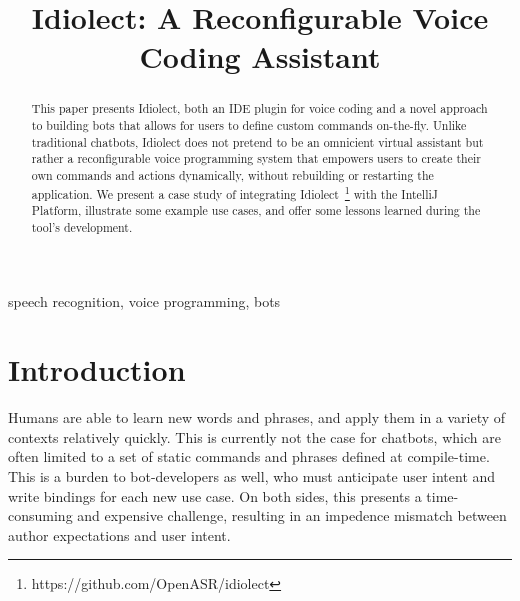 \documentclass[conference]{IEEEtran}
\begin{document}
\title{Idiolect: A Reconfigurable Voice Coding Assistant}

\author{
\and
{}
\and
{}
\and
{}
}

\maketitle

\begin{abstract}
This paper presents Idiolect, both an IDE plugin for voice coding and a novel approach to building bots that allows for users to define custom commands on-the-fly. Unlike traditional chatbots, Idiolect does not pretend to be an omnicient virtual assistant but rather a reconfigurable voice programming system that empowers users to create their own commands and actions dynamically, without rebuilding or restarting the application. We present a case study of integrating Idiolect~\footnote{https://github.com/OpenASR/idiolect} with the IntelliJ Platform, illustrate some example use cases, and offer some lessons learned during the tool's development.
\end{abstract}

\begin{IEEEkeywords}
    speech recognition, voice programming, bots
\end{IEEEkeywords}

\section{Introduction}


Humans are able to learn new words and phrases, and apply them in a variety of contexts relatively quickly. This is currently not the case for chatbots, which are often limited to a set of static commands and phrases defined at compile-time. This is a burden to bot-developers as well, who must anticipate user intent and write bindings for each new use case. On both sides, this presents a time-consuming and expensive challenge, resulting in an impedence mismatch between author expectations and user intent.
\end{document}
